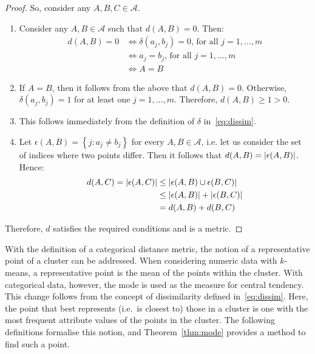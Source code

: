 \begin{definition}
\begin{proof}
        So, consider any \(A, B, C \in \mathcal A\).
        \begin{enumerate}
            \item Consider any \(A, B \in \mathcal A\) such that
                \(d(A, B) = 0\). Then:
                \[
                    \begin{aligned}
                        d(A, B) = 0
                        & \iff \delta\left(a_j, b_j\right) = 0 \text{, for all }
                            j=1,\ldots,m\\
                        & \iff a_j = b_j \text{, for all } j=1,\ldots,m\\
                        & \iff A = B
                    \end{aligned}
                \]
            \item If \(A = B\), then it follows from the above that
                \(d(A, B) = 0\). Otherwise, \(\delta\left(a_j, b_j\right) = 1\)
                for at least one \(j = 1, \ldots, m\). Therefore,
                \(d(A, B) \geq 1 > 0\).
            \item This follows immediately from the definition of \(\delta\)
                in~\eqref{eq:dissim}.
            \item Let \(\epsilon(A, B) = \left\{j : a_j \neq b_j\right\}\) for
                every \(A, B \in \mathcal A\), i.e. let us consider the set of
                indices where two points differ. Then it follows that
                \(d(A, B) = \abs*{\epsilon (A, B)}\). Hence:
                \[
                    \begin{aligned}
                        d(A, C) = \abs*{\epsilon(A, C)}
                        & \leq \abs*{\epsilon(A, B) \cup \epsilon(B, C)}\\
                        & \leq \abs*{\epsilon(A, B)} + \abs*{\epsilon(B, C)}\\
                        & = d(A, B) + d(B, C)
                    \end{aligned}
                \]
        \end{enumerate}

        Therefore, \(d\) satisfies the required conditions and is a metric.
    \end{proof}
\end{definition}

With the definition of a categorical distance metric, the notion of a
representative point of a cluster can be addressed. When considering numeric
data with \(k\)-means, a representative point is the mean of the points within
the cluster. With categorical data, however, the mode is used as the measure for
central tendency. This change follows from the concept of dissimilarity defined
in~\eqref{eq:dissim}. Here, the point that best represents (i.e.\ is closest to)
those in a cluster is one with the most frequent attribute values of the points
in the cluster. The following definitions formalise this notion, and
Theorem~\ref{thm:mode} provides a method to find such a point.

